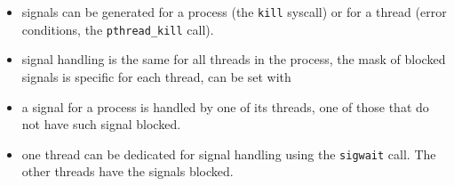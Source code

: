 \begin{slide}
\prgchars
\begin{itemize}
\item signals can be generated for a process (the \texttt{kill} syscall) or
for a thread (error conditions, the \texttt{pthread\_kill} call).
\item signal handling is the same for all threads in the process,
the mask of blocked signals is specific for each thread, can be set with
\end{itemize}
\begin{itemize}
\item a signal for a process is handled by one of its threads, one of those
that do not have such signal blocked.
\item one thread can be dedicated for signal handling using the
\texttt{sigwait} call. The other threads have the signals blocked.
\end{itemize}
\end{slide}

\label{PTHREADSIGMASK}

